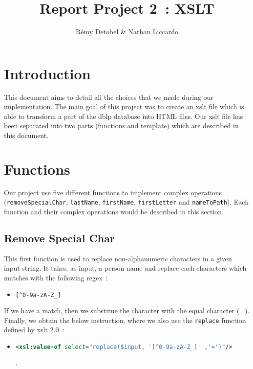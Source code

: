 \documentclass{article}
\author{R\'emy Detobel \& Nathan Liccardo}
\title{Report Project 2~: XSLT}
\begin{document}
\maketitle

\section{Introduction}
  This document aims to detail all the choices that we made during our implementation. The main goal of this project was to create an xslt file which is able to transform a part of the dblp database into HTML files. Our xslt file has been separated into two parts (functions and template) which are described in this document.

\section{Functions}
  Our project use five different functions to implement complex operations (\verb|removeSpecialChar|, \verb|lastName|, \verb|firstName|, \verb|firstLetter| and \verb|nameToPath|). Each function and their complex operations would be described in this section.

  \subsection{Remove Special Char} 
    This first function is used to replace non-alphanumeric characters in a given input string. It takes, as input, a person name and replace each characters which matches with the following regex~:
    \begin{itemize}
      \item \verb|[^0-9a-zA-Z_]|
    \end{itemize} 
    If we have a match, then we substitue the character with the equal character (=). Finally, we obtain the below instruction, where we also use the \verb|replace| function defined by xslt 2.0~:
    \begin{itemize}
      \item \begin{lstlisting}[language=XML]
<xsl:value-of select="replace($input, '[^0-9a-zA-Z_]' ,'=')"/>\end{lstlisting}.
    \end{itemize}
\end{document}
